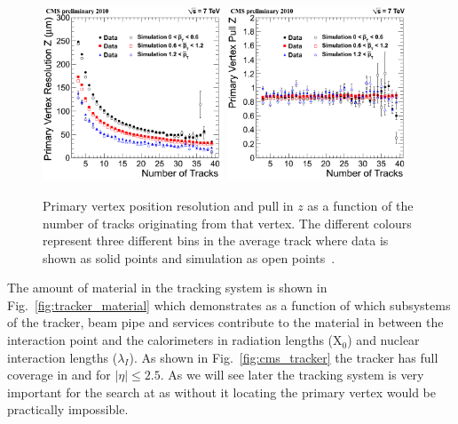 \begin{figure}
  \includegraphics[width=0.48\textwidth]{cms_experiment/plots/ResZ_byPt.png}
  \includegraphics[width=0.48\textwidth]{cms_experiment/plots/PullZ_byPt.png}
  \caption[Vertex resolution]{Primary vertex position resolution and pull in $z$ as a function of the number of tracks originating from that vertex. The different colours represent three different bins in the average track \pT where data is shown as solid points and simulation as open points~\cite{cms-tracker-performance-2010}.}
  \label{fig:tracker_vertex_resolution}
\end{figure}

The amount of material in the tracking system is shown in Fig.~\ref{fig:tracker_material} which demonstrates as a function of \eta which subsystems of the tracker, beam pipe and services contribute to the material in between the interaction point and the calorimeters in radiation lengths (X$_{0}$) and nuclear interaction lengths ($\lambda_{I}$). As shown in Fig.~\ref{fig:cms_tracker} the tracker has full coverage in \phi and for $|\eta|\leq2.5$. As we will see later the tracking system is very important for the \Hgg search at \CMS as without it locating the primary vertex would be practically impossible.

